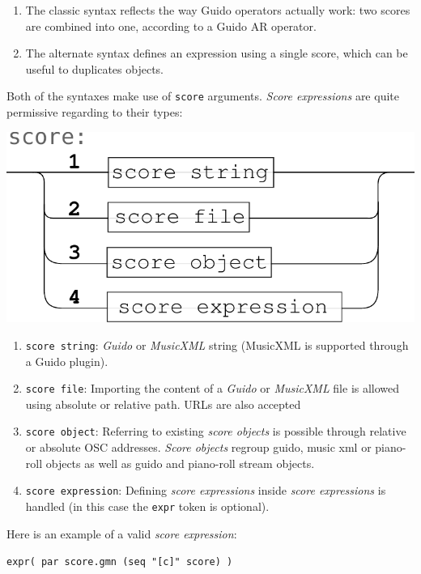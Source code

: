\documentclass{article}
\newcommand{\OSC}[1]{\texttt{#1}}
\newcommand{\sExpr}{\emph{score expressions} }
\newcommand{\SExpr}{\emph{Score expressions} }
\newcommand{\sample}	[1]			{\vspace{-1.8em}\begin{center}\colorbox{mygrey}{\begin{minipage}[t]{1\columnwidth} {\small \texttt{#1}}\end{minipage}}\end{center}}
\begin{document}
\begin{enumerate}
\item The classic syntax reflects the way Guido operators actually work: two scores are combined into one, according to a Guido AR operator.
\item The alternate syntax defines an expression using a single score, which can be useful to duplicates objects.
\end{enumerate}

\smallbreak

Both of the syntaxes make use of \OSC{score} arguments. \SExpr are quite permissive regarding to their types:
\begin{center}
\includegraphics[width=0.7\columnwidth]{imgs/syntax2}
\end{center}

\begin{enumerate}
\item \OSC{score string}: \emph{Guido} or \emph{MusicXML} string (MusicXML is supported through a Guido plugin).
\item \OSC{score file}:  Importing  the content of a \emph{Guido} or \emph{MusicXML} file is allowed using absolute or relative path. URLs are also accepted
\item \OSC{score object}:  Referring to existing \emph{score objects} is possible through relative or absolute OSC addresses. \emph{Score objects} regroup guido, music xml or piano-roll objects as well as guido and piano-roll stream objects.
\item \OSC{score expression}:  Defining \sExpr inside \sExpr is handled (in this case the \OSC{expr} token is optional).
\end{enumerate}

Here is an example of a valid \emph{score expression}:
\sample{expr( par score.gmn (seq "[c]" score) )}

\end{document}
